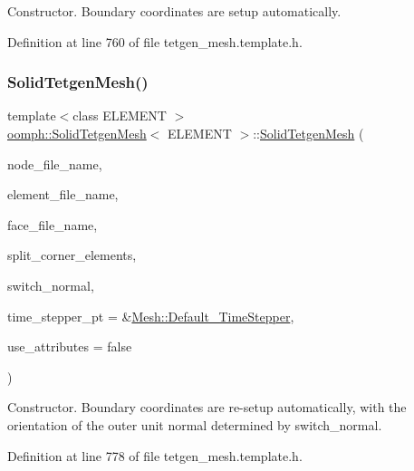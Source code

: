 Constructor. Boundary coordinates are setup automatically. 



Definition at line 760 of file tetgen\+\_\+mesh.\+template.\+h.

\mbox{\label{classoomph_1_1SolidTetgenMesh_a465c659e5bac66790a81f013bef23157}} 
\subsubsection{\texorpdfstring{Solid\+Tetgen\+Mesh()}{SolidTetgenMesh()}\hspace{0.1cm}{\footnotesize\ttfamily [2/2]}}
{\footnotesize\ttfamily template$<$class E\+L\+E\+M\+E\+NT $>$ \\
\hyperlink{classoomph_1_1SolidTetgenMesh}{oomph\+::\+Solid\+Tetgen\+Mesh}$<$ E\+L\+E\+M\+E\+NT $>$\+::\hyperlink{classoomph_1_1SolidTetgenMesh}{Solid\+Tetgen\+Mesh} (\begin{DoxyParamCaption}\item[{const std\+::string \&}]{node\+\_\+file\+\_\+name,  }\item[{const std\+::string \&}]{element\+\_\+file\+\_\+name,  }\item[{const std\+::string \&}]{face\+\_\+file\+\_\+name,  }\item[{const bool \&}]{split\+\_\+corner\+\_\+elements,  }\item[{const bool \&}]{switch\+\_\+normal,  }\item[{\hyperlink{classoomph_1_1TimeStepper}{Time\+Stepper} $\ast$}]{time\+\_\+stepper\+\_\+pt = {\ttfamily \&\hyperlink{classoomph_1_1Mesh_a12243d0fee2b1fcee729ee5a4777ea10}{Mesh\+::\+Default\+\_\+\+Time\+Stepper}},  }\item[{const bool \&}]{use\+\_\+attributes = {\ttfamily false} }\end{DoxyParamCaption})\hspace{0.3cm}{\ttfamily [inline]}}



Constructor. Boundary coordinates are re-\/setup automatically, with the orientation of the outer unit normal determined by switch\+\_\+normal. 



Definition at line 778 of file tetgen\+\_\+mesh.\+template.\+h.




